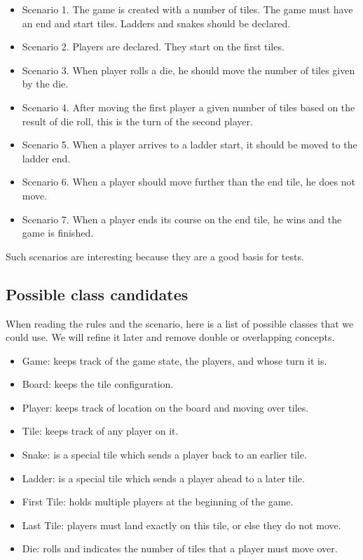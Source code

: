 \documentclass[10pt,twoside,english]{_support/latex/sbabook/sbabook}
\begin{document}
\begin{itemize}
\item Scenario 1. The game is created with a number of tiles. The game must have an end and start tiles. Ladders and snakes should be declared.
\item Scenario 2. Players are declared. They start on the first tiles. 
\item Scenario 3. When player rolls a die, he should move the number of tiles given by the die.
\item Scenario 4. After moving the first player a given number of tiles based on the result of die roll, this is the turn of the second player.
\item Scenario 5. When a player arrives to a ladder start, it should be moved to the ladder end.
\item Scenario 6. When a player should move further than the end tile, he does not move.
\item Scenario 7. When a player ends its course on the end tile, he wins and the game is finished.
\end{itemize}

Such scenarios are interesting because they are a good basis for tests.
\subsection{Possible class candidates}
When reading the rules and the scenario, here is a list of possible classes that we could use.
We will refine it later and remove double or overlapping concepts.

\begin{itemize}
\item Game: keeps track of the game state, the players, and whose turn it is.
\item Board: keeps the tile configuration. 
\item Player:  keeps track of location on the board and moving over tiles.
\item Tile: keeps track of any player on it. 
\item Snake: is a special tile which sends a player back to an earlier tile.
\item Ladder: is a special tile which sends a player ahead to a later tile.
\item First Tile: holds multiple players at the beginning of the game.
\item Last Tile: players must land exactly on this tile, or else they do not move.
\item Die: rolls and indicates the number of tiles that a player must move over.
\end{itemize}
\end{document}

